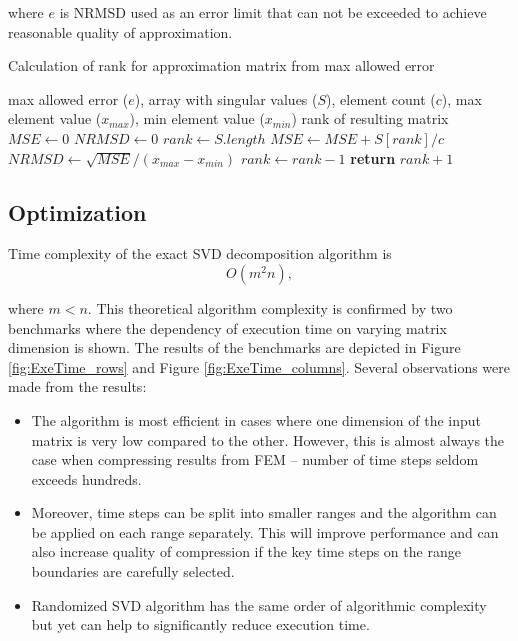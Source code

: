 where $e$ is NRMSD used as an error limit that can not be exceeded to achieve reasonable quality of approximation.

\begin{algorithm}
  \caption{Calculation of rank for approximation matrix from max allowed error}\label{rankAlgorithm}
  \label{alg:rank-calculation}
  \begin{algorithmic}[1]
  	\INPUT max allowed error ($e$), array with singular values ($S$), element count ($c$), max element value ($x_{max}$), min element value ($x_{min}$)
    \OUTPUT rank of resulting matrix
      \State $MSE \gets 0$
      \State $NRMSD \gets 0$
      \State $rank \gets S.length$
        \State $MSE \gets MSE + S[rank]/c$ 
        \State $NRMSD \gets \sqrt{MSE} / (x_{max} - x_{min})$ 
        \State $rank \gets rank - 1$ 
      \EndWhile
      \State \textbf{return} $rank + 1$ 
    \EndProcedure
  \end{algorithmic}
\end{algorithm}

\subsection{Optimization}

Time complexity of the exact SVD decomposition algorithm is $$O(m^2n),$$

where $m<n$. This theoretical algorithm complexity is confirmed by two benchmarks where the dependency of execution time on varying matrix dimension is shown. The results of the benchmarks are depicted in Figure \ref{fig:ExeTime_rows} and Figure \ref{fig:ExeTime_columns}. Several observations were made from the results:

\begin{itemize}
\item The algorithm is most efficient in cases where one dimension of the input matrix is very low compared to the other. However, this is almost always the case when compressing results from FEM -- number of time steps seldom exceeds hundreds.
\item Moreover, time steps can be split into smaller ranges and the algorithm can be applied on each range separately. This will improve performance and can also increase quality of compression if the key time steps on the range boundaries are carefully selected.
\item Randomized SVD algorithm has the same order of algorithmic complexity but yet can help to significantly reduce execution time.
\end{itemize}

